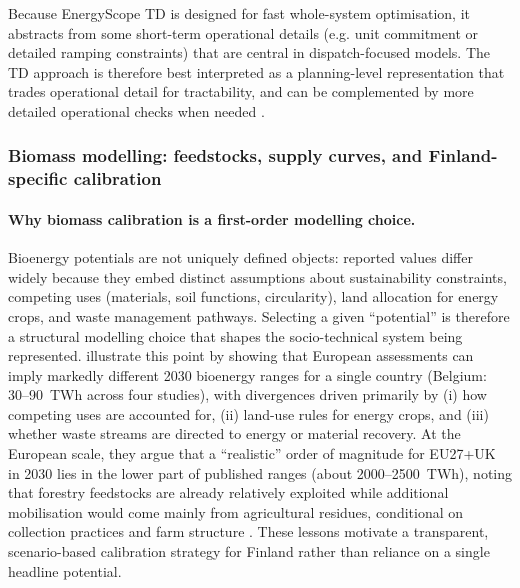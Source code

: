 \documentclass{article}
\begin{document}
Because EnergyScope TD is designed for fast whole-system optimisation, it abstracts from some short-term operational details (e.g. unit commitment or detailed ramping constraints) that are central in dispatch-focused models. The TD approach is therefore best interpreted as a planning-level representation that trades operational detail for tractability, and can be complemented by more detailed operational checks when needed \citep{thiranExploringOptionsFossilfree2025}.


\subsubsection{Biomass modelling: feedstocks, supply curves, and Finland-specific calibration}
\label{sec:biomass_modelling}

\paragraph{Why biomass calibration is a first-order modelling choice.}
Bioenergy potentials are not uniquely defined objects: reported values differ widely because they embed distinct assumptions about sustainability constraints, competing uses (materials, soil functions, circularity), land allocation for energy crops, and waste management pathways. Selecting a given ``potential'' is therefore a structural modelling choice that shapes the socio-technical system being represented. \citet{collaNavigatingBioenergyHorizons2024} illustrate this point by showing that European assessments can imply markedly different 2030 bioenergy ranges for a single country (Belgium: 30--90~TWh across four studies), with divergences driven primarily by (i) how competing uses are accounted for, (ii) land-use rules for energy crops, and (iii) whether waste streams are directed to energy or material recovery. At the European scale, they argue that a ``realistic'' order of magnitude for EU27+UK in 2030 lies in the lower part of published ranges (about 2000--2500~TWh), noting that forestry feedstocks are already relatively exploited while additional mobilisation would come mainly from agricultural residues, conditional on collection practices and farm structure \citep{collaNavigatingBioenergyHorizons2024}. These lessons motivate a transparent, scenario-based calibration strategy for Finland rather than reliance on a single headline potential.
\end{document}
